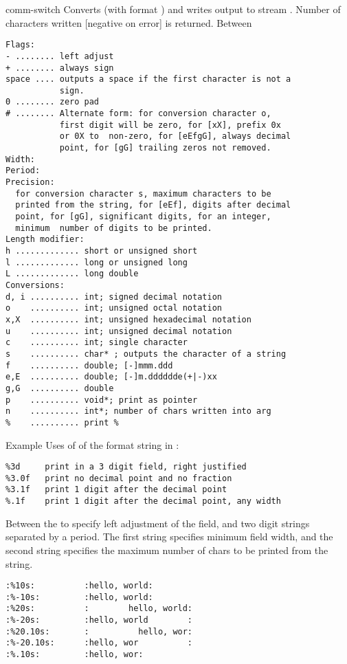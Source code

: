 \begin{Ventry2}{comm-switch  }
     Converts (with format ) and writes output to stream
     . Number of characters written [negative on error] is
     returned. Between %

\begin{production}
\begin{verbatim}
Flags:
- ........ left adjust
+ ........ always sign
space .... outputs a space if the first character is not a 
           sign.
0 ........ zero pad
# ........ Alternate form: for conversion character o, 
           first digit will be zero, for [xX], prefix 0x 
           or 0X to  non-zero, for [eEfgG], always decimal 
           point, for [gG] trailing zeros not removed.
Width:
Period:
Precision: 
  for conversion character s, maximum characters to be
  printed from the string, for [eEf], digits after decimal 
  point, for [gG], significant digits, for an integer, 
  minimum  number of digits to be printed.
Length modifier:
h ............. short or unsigned short
l ............. long or unsigned long
L ............. long double
Conversions:
d, i .......... int; signed decimal notation
o    .......... int; unsigned octal notation
x,X  .......... int; unsigned hexadecimal notation
u    .......... int; unsigned decimal notation
c    .......... int; single character
s    .......... char* ; outputs the character of a string
f    .......... double; [-]mmm.ddd
e,E  .......... double; [-]m.dddddde(+|-)xx
g,G  .......... double
p    .......... void*; print as pointer
n    .......... int*; number of chars written into arg
%    .......... print %
\end{verbatim}
\end{production}
Example Uses of of the format string in :

\begin{verbatim}
%3d     print in a 3 digit field, right justified
%3.0f   print no decimal point and no fraction
%3.1f   print 1 digit after the decimal point
%.1f    print 1 digit after the decimal point, any width
\end{verbatim}

Between the %
to specify left adjustment of the field, and two digit strings
separated by a period.  The first string specifies minimum field
width, and the second string specifies the maximum number of chars
to be printed from the string.

\begin{verbatim}
:%10s:          :hello, world:
:%-10s:         :hello, world:
:%20s:          :        hello, world:
:%-20s:         :hello, world        :
:%20.10s:       :          hello, wor:
:%-20.10s:      :hello, wor          :
:%.10s:         :hello, wor:
\end{verbatim}


\end{Ventry2}
